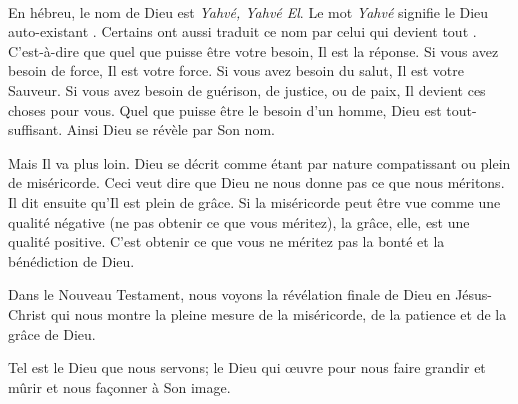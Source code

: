 \dvrule






 \\[1ex]
En hébreu, le nom de Dieu est \emph{Yahvé, Yahvé El}.
 Le mot \emph{Yahvé} signifie le \og Dieu auto-existant \fg{}.
 Certains ont aussi traduit ce nom par \og celui qui devient tout \fg{}.
 C'est-à-dire que quel que puisse être votre besoin, Il est la réponse.
 Si vous avez besoin de force, Il est votre force.
 Si vous avez besoin du salut, Il est votre Sauveur.
 Si vous avez besoin de guérison, de justice, ou de paix,
 Il devient ces choses pour vous.
 Quel que puisse être le besoin d'un homme, Dieu est tout-suffisant.
 Ainsi Dieu se révèle par Son nom.

Mais Il va plus loin. Dieu se décrit comme étant par nature compatissant
 ou plein de miséricorde. Ceci veut dire que Dieu ne nous donne pas
 ce que nous méritons.
 Il dit ensuite qu'Il est plein de grâce.
 Si la miséricorde peut être vue comme une qualité négative
 (ne pas obtenir ce que vous méritez), la grâce, elle, est une qualité positive.
 C'est obtenir ce que vous ne méritez pas
 \ocadr{}la bonté et la bénédiction de Dieu.


Dans le Nouveau Testament, nous voyons la révélation finale de Dieu
 en Jésus-Christ qui nous montre la pleine mesure de la miséricorde,
 de la patience et de la grâce de Dieu.

Tel est le Dieu que nous servons; le Dieu qui œuvre pour nous faire grandir
 et mûrir et nous façonner à Son image. 

\dvrule




